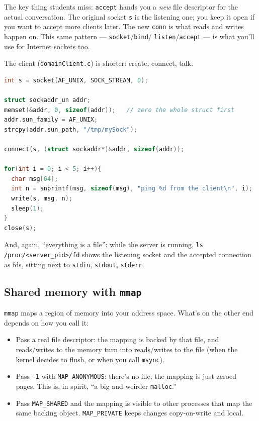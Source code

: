 \documentclass[11pt]{article}
\begin{document}
The key thing students miss: \texttt{accept} hands you a \emph{new}
file descriptor for the actual conversation. The original socket
\texttt{s} is the listening one; you keep it open if you want to
accept more clients later. The new \texttt{conn} is what reads and
writes happen on. This same pattern --- \texttt{socket}/\texttt{bind}/
\texttt{listen}/\texttt{accept} --- is what you'll use for Internet
sockets too.

The client (\texttt{domainClient.c}) is shorter: create, connect,
talk.

\begin{lstlisting}[language=C]
int s = socket(AF_UNIX, SOCK_STREAM, 0);

struct sockaddr_un addr;
memset(&addr, 0, sizeof(addr));   // zero the whole struct first
addr.sun_family = AF_UNIX;
strcpy(addr.sun_path, "/tmp/mySock");

connect(s, (struct sockaddr*)&addr, sizeof(addr));

for(int i = 0; i < 5; i++){
  char msg[64];
  int n = snprintf(msg, sizeof(msg), "ping %d from the client\n", i);
  write(s, msg, n);
  sleep(1);
}
close(s);
\end{lstlisting}

And, again, ``everything is a file'': while the server is running,
\texttt{ls /proc/<server\_pid>/fd} shows the listening socket and
the accepted connection as fds, sitting next to \texttt{stdin},
\texttt{stdout}, \texttt{stderr}.

\subsection*{Shared memory with \texttt{mmap}}

\texttt{mmap} maps a region of memory into your address space.
What's on the other end depends on how you call it:
\begin{itemize}
  \item Pass a real file descriptor: the mapping is backed by that
    file, and reads/writes to the memory turn into reads/writes to
    the file (when the kernel decides to flush, or when you call
    \texttt{msync}).
  \item Pass \texttt{-1} with \texttt{MAP\_ANONYMOUS}: there's no
    file; the mapping is just zeroed pages. This is, in spirit,
    ``a big and weirder \texttt{malloc}.''
  \item Pass \texttt{MAP\_SHARED} and the mapping is visible to
    other processes that map the same backing object.
    \texttt{MAP\_PRIVATE} keeps changes copy-on-write and local.
\end{itemize}
\end{document}
